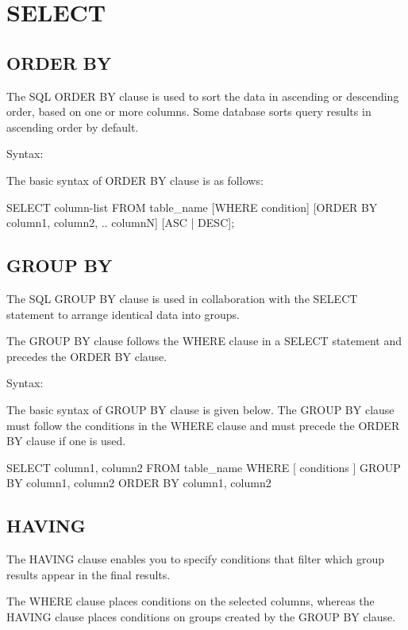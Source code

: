 \section{SELECT}

\subsection{ORDER BY}

The SQL ORDER BY clause is used to sort the data in ascending or descending order, based on one or more columns. Some database sorts query results in ascending order by default.

Syntax:

The basic syntax of ORDER BY clause is as follows:

\begin{Code}
	SELECT column-list 
	FROM table_name 
	[WHERE condition] 
	[ORDER BY column1, column2, .. columnN] [ASC | DESC];
\end{Code}

\subsection{GROUP BY}
The SQL GROUP BY clause is used in collaboration with the SELECT statement to arrange identical data into groups.

The GROUP BY clause follows the WHERE clause in a SELECT statement and precedes the ORDER BY clause.

Syntax:

The basic syntax of GROUP BY clause is given below. The GROUP BY clause must follow the conditions in the WHERE clause and must precede the ORDER BY clause if one is used.

\begin{Code}
	SELECT column1, column2
	FROM table_name
	WHERE [ conditions ]
	GROUP BY column1, column2
	ORDER BY column1, column2
\end{Code}

\subsection{HAVING}

The HAVING clause enables you to specify conditions that filter which group results appear in the final results.

The WHERE clause places conditions on the selected columns, whereas the HAVING clause places conditions on groups created by the GROUP BY clause.

